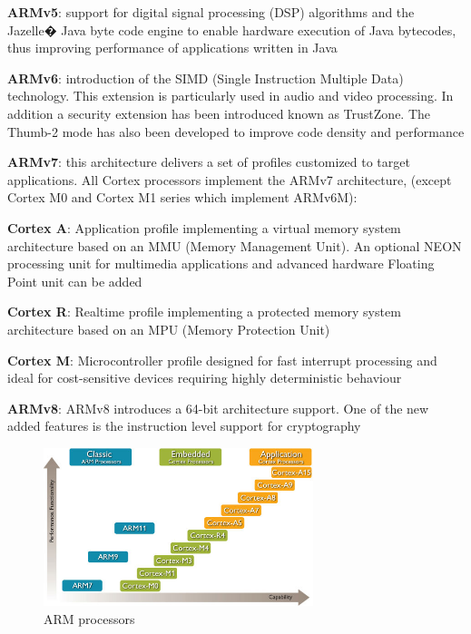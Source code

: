 \documentclass[pdftex,10pt,a4paper]{report}
\newenvironment{packed_item}{
\begin{itemize}
  \setlength{\itemsep}{1pt}
  \setlength{\parskip}{0pt}
  \setlength{\parsep}{0pt}
}{\end{itemize}}
\begin{document}
\begin{packed_item}
	\item \textbf{ARMv5}: support for digital signal processing (DSP) algorithms and the Jazelle� Java byte code engine to enable hardware execution of Java bytecodes, thus improving performance of applications written in Java
	\item \textbf{ARMv6}: introduction of the SIMD (Single Instruction Multiple Data) technology. This extension is particularly used in audio and video processing. In addition a security extension has been introduced known as TrustZone. The Thumb-2 mode has also been developed to improve code density and performance
	\item \textbf{ARMv7}: this architecture delivers a set of profiles customized to target applications. All Cortex processors implement the ARMv7 architecture, (except Cortex M0 and Cortex M1 series which implement ARMv6M):
	\begin{packed_item}
		\item \textbf{Cortex A}: Application profile implementing a virtual memory system architecture based on an MMU (Memory Management Unit). An optional NEON processing unit for multimedia applications and advanced hardware Floating Point unit can be added
		\item \textbf{Cortex R}: Realtime profile implementing a protected memory system architecture based on an MPU (Memory Protection Unit)
		\item \textbf{Cortex M}: Microcontroller profile designed for fast interrupt processing and ideal for cost-sensitive devices requiring highly deterministic behaviour
	\end{packed_item}
	\item \textbf{ARMv8}: ARMv8 introduces a 64-bit architecture support. One of the new added features is the instruction level support for cryptography
\end{packed_item}


\begin{figure}[h!]
\centering
\includegraphics[width=0.7\textwidth]{./arm_proc.jpg}
\caption{ARM processors}
\label{ARM processors}
\end{figure}
\end{document}
